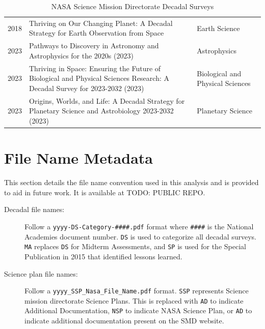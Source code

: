 \documentclass[preprint,12pt]{elsarticle}
\begin{document}
\begin{table}[H]
\begin{tabular}{p{1.2cm} p{8.5cm} p{2.9cm}}
 2018 & Thriving on Our Changing Planet: A Decadal Strategy for Earth Observation from Space & Earth Science \\

 2023 & Pathways to Discovery in Astronomy and Astrophysics for the 2020s (2023) & Astrophysics \\

 2023 & Thriving in Space: Ensuring the Future of Biological and Physical Sciences Research: A Decadal Survey for 2023-2032 (2023) & Biological and Physical Sciences \\

 2023 & Origins, Worlds, and Life: A Decadal Strategy for Planetary Science and Astrobiology 2023-2032 (2023) & Planetary Science \\

\end{tabular}
\caption{NASA Science Mission Directorate Decadal Surveys}\label{tab:decadals_all}
\end{table}

\section{File Name Metadata}
\label{app_file_names}
This section details the file name convention used in this analysis and is provided to aid in future work. It is available at TODO: PUBLIC REPO. 

\begin{description}
 \item[Decadal file names:] Follow a \texttt{yyyy-DS-Category-\#\#\#\#.pdf} format where \texttt{\#\#\#\#} is the National Academies document number. \texttt{DS} is used to categorize all decadal surveys. \texttt{MA} replaces \texttt{DS} for Midterm Assessments, and \texttt{SP} is used for the Special Publication in 2015 that identified lessons learned.
 
 \item[Science plan file names:] Follow a \texttt{yyyy\_SSP\_Nasa\_File\_Name.pdf} format. \texttt{SSP} represents Science mission directorate Science Plans. This is replaced with \texttt{AD} to indicate Additional Documentation, \texttt{NSP} to indicate NASA Science Plan, or \texttt{AD} to indicate additional documentation present on the SMD website.
\end{description} 




 

\end{document}
